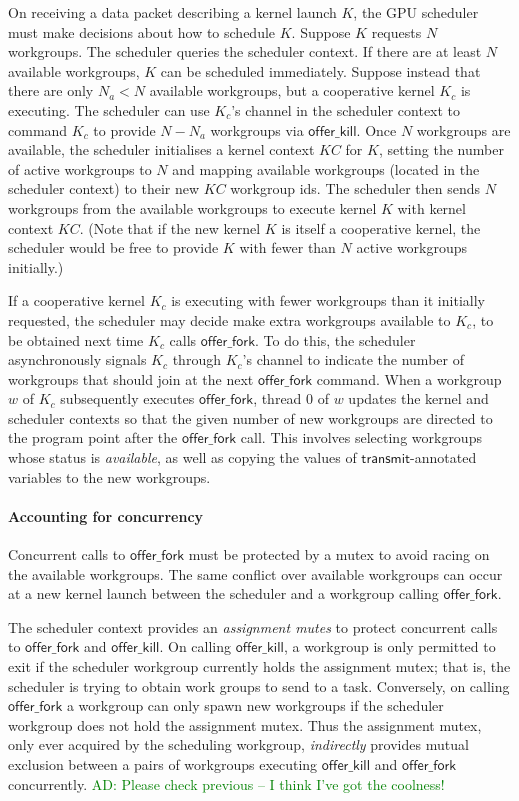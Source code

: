 \documentclass[numbers,nocopyrightspace,10pt]{sigplanconf}
\newcommand{\ADComment}[1]{\textcolor{green}{AD: #1}}
\newcommand{\KC}{\mathit{KC}}
\newcommand{\transmit}{\mathsf{transmit}}
\newcommand{\offerfork}{\mathsf{offer\_fork}}
\newcommand{\offerkill}{\mathsf{offer\_kill}}
\begin{document}
On receiving a data packet
describing a kernel launch $K$, the GPU scheduler must make decisions
about how to schedule $K$. Suppose $K$ requests
$N$ workgroups. The scheduler queries the scheduler context.  If
there are at least $N$ available workgroups, $K$ can be scheduled
immediately. Suppose instead that there are only $N_a < N$ available workgroups, but a cooperative kernel $K_c$ is
executing. The scheduler can use $K_c$'s channel in the scheduler context to command $K_c$ to provide $N - N_a$ workgroups via $\offerkill$.
Once $N$ workgroups are available, the scheduler initialises a
kernel context $\KC$ for $K$, setting the number of active workgroups
to $N$ and mapping available workgroups (located in the scheduler
context) to their new $\KC$ workgroup ids. The scheduler then sends $N$
workgroups from the available workgroups to execute kernel $K$ with
kernel context $\KC$.  (Note that if the new kernel $K$ is itself a cooperative kernel, the scheduler would be free to provide $K$ with fewer than $N$ active workgroups initially.)

If a cooperative kernel $K_c$ is executing with fewer workgroups than it initially requested, the scheduler may decide make extra workgroups available
to $K_c$, to be obtained next time $K_c$ calls $\offerfork$.  To do this, the scheduler asynchronously signals $K_c$ through $K_c$'s
channel to indicate the number of
workgroups that should join at the next $\offerfork$ command.
When a workgroup $w$ of $K_c$ subsequently executes $\offerfork$, thread 0 of $w$ updates the kernel and scheduler contexts so that the given number of new workgroups are directed to the program point after the $\offerfork$ call.  This involves selecting workgroups whose status is \emph{available}, as well as copying the values of $\transmit$-annotated variables to the new workgroups.

\paragraph{Accounting for concurrency}

Concurrent calls to $\offerfork$ must be protected by a mutex
to avoid racing on the
available workgroups. The same conflict over available workgroups can
occur at a new kernel launch between the scheduler and a workgroup
calling $\offerfork$.

The scheduler context provides an \emph{assignment mutes} to protect concurrent calls to
$\offerfork$ and $\offerkill$.  On calling $\offerkill$, a workgroup is only permitted to exit if the scheduler workgroup currently holds the assignment mutex; that is, the scheduler is trying to obtain work
groups to send to a task.  Conversely, on calling $\offerfork$ a workgroup can only spawn new workgroups if the scheduler workgroup does not hold the assignment mutex.  Thus the assignment mutex, only ever acquired by the scheduling workgroup, \emph{indirectly} provides mutual exclusion between a pairs of workgroups executing $\offerkill$ and $\offerfork$ concurrently. \ADComment{Please check previous -- I think I've got the coolness!}
\end{document}

